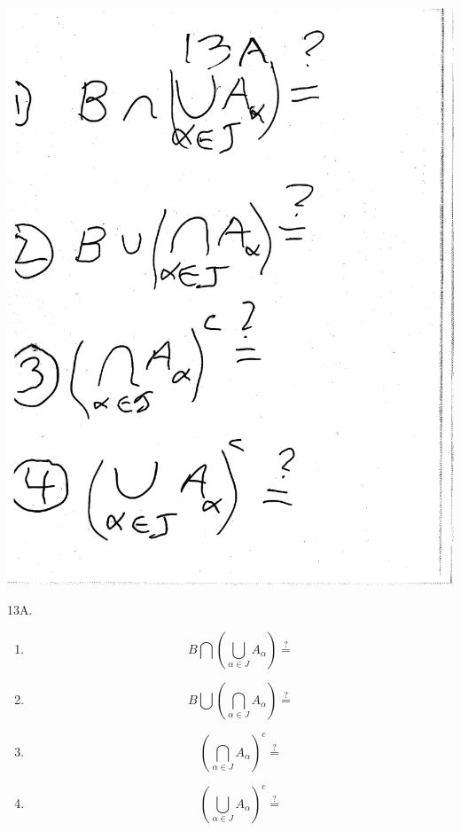 \documentclass[10pt,a4paper]{article}
\begin{document}
\includegraphics[scale=.5]{Pages/Page_13A}

13A. 
\begin{enumerate}
\item $$B \bigcap (\bigcup_{\alpha \in J} A_\alpha) \stackrel{?}{=}$$
\item $$B \bigcup (\bigcap_{\alpha \in J} A_\alpha) \stackrel{?}{=}$$
\item $$(\bigcap_{\alpha \in J} A_\alpha)^c \stackrel{?}{=}$$
\item $$(\bigcup_{\alpha \in J} A_\alpha)^c \stackrel{?}{=}$$
\end{enumerate}

\vspace{.20 in}
\end{document}
